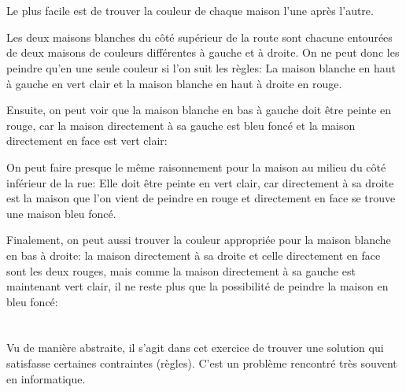{{%
\section*{\BrochureSolution}
Le plus facile est de trouver la couleur de chaque maison l’une après l’autre.

Les deux maisons blanches du côté supérieur de la route sont chacune entourées de deux maisons de couleurs différentes à gauche et à droite. On ne peut donc les peindre qu’en une seule couleur si l’on suit les règles: La maison blanche en haut à gauche en vert clair et la maison blanche en haut à droite en rouge.

{\centering%
\par}

Ensuite, on peut voir que la maison blanche en bas à gauche doit être peinte en rouge, car la maison directement à sa gauche est bleu foncé et la maison directement en face est vert clair:

{\centering%
\par}

On peut faire presque le même raisonnement pour la maison au milieu du côté inférieur de la rue: Elle doit être peinte en vert clair, car directement à sa droite est la maison que l’on vient de peindre en rouge et directement en face se trouve une maison bleu foncé.

{\centering%
\par}

\begin{samepage}
Finalement, on peut aussi trouver la couleur appropriée pour la maison blanche en bas à droite: la maison directement à sa droite et celle directement en face sont les deux rouges, mais comme la maison directement à sa gauche est maintenant vert clair, il ne reste plus que la possibilité de peindre la maison en bleu foncé:

\nopagebreak

{\centering%
\par}
\end{samepage}



\section*{\BrochureItsInformatics}
Vu de manière abstraite, il s’agit dans cet exercice de trouver une solution qui satisfasse certaines contraintes (règles). C’est un problème rencontré très souvent en informatique.

}}
